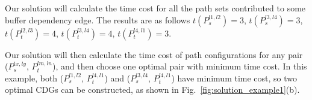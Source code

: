 Our solution will calculate the time cost for all the path sets contributed to some buffer dependency edge. The results are as follows $t(P_s^{l1,l2}) = 3$, $t(P_s^{l3,l4}) = 3$, $t(P_t^{l2,l3}) = 4$, $t(P_t^{l3,l4}) = 4$, $t(P_t^{l4,l1}) = 3$.

Our solution will then calculate the time cost of path configurations for any pair ($P_s^{lx,ly}$, $P_t^{lm,ln}$), and then choose one optimal pair with minimum time cost. In this example, both ($P_s^{l1,l2}$, $P_t^{l4,l1}$) and ($P_s^{l3,l4}$, $P_t^{l4,l1}$) have minimum time cost, so two optimal CDGs can be constructed, as shown in Fig.~\ref{fig:solution_example1}(b). 


%

